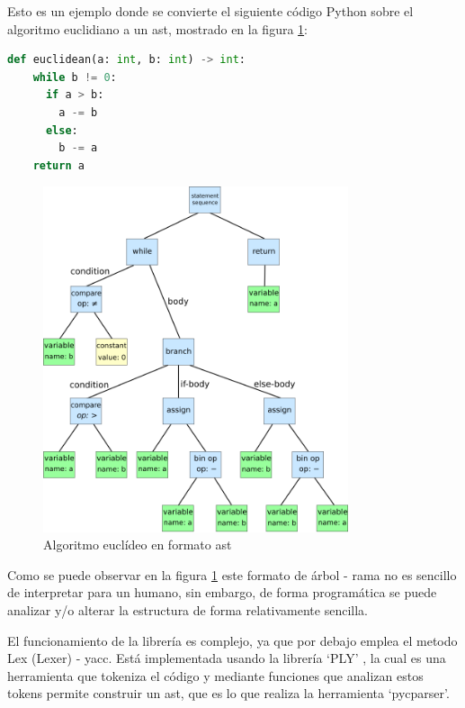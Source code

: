 Esto es un ejemplo donde se convierte el siguiente código Python sobre el algoritmo euclidiano a un \acrshort{ast}, mostrado en la figura \ref{fig:ast}:

\begin{lstlisting}[language=Python, caption=Python - Algoritmo euclidiano]
def euclidean(a: int, b: int) -> int:
    while b != 0:
      if a > b:
        a -= b
      else:
        b -= a
    return a
\end{lstlisting}

\begin{figure}[htb!]
      \centering                        
      \includegraphics[width=0.8\textwidth]{images/AST.png}
      \caption{Algoritmo euclídeo en formato \acrshort{ast} }
      \label{fig:ast}
\end{figure}
\FloatBarrier
Como se puede observar en la figura \ref{fig:ast} este formato de árbol - rama no es sencillo de interpretar para un humano, sin embargo, de forma programática se puede analizar y/o alterar la estructura de forma relativamente sencilla.

El funcionamiento de la librería es complejo, ya que por debajo emplea el metodo Lex (Lexer) - \acrfull{yacc}.
Está implementada usando la librería `PLY' \cite{ply}, la cual es una herramienta que tokeniza el código y mediante funciones que analizan estos tokens permite construir un \acrshort{ast}, que es lo que realiza la herramienta `pycparser'.

